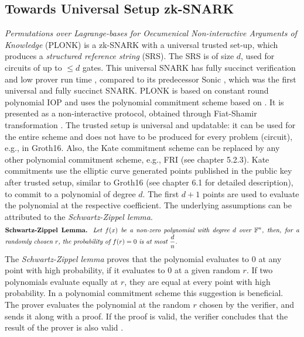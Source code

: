 \subsection{Towards Universal Setup zk-SNARK}
\textit{Permutations over Lagrange-bases for Oecumenical Non-interactive Arguments of Knowledge} (PLONK) is a zk-SNARK with a universal trusted set-up, which produces a \textit{structured reference string} (SRS). The SRS is of size \(d\), used for circuits of up to \(\leq d\) gates. This universal SNARK has fully succinct verification and low prover run time \citep{PLONKcryptoeprint:2019/953}, compared to its predecessor Sonic \citep{SONIC10.1145/3319535.3339817}, which was the first universal and fully succinct SNARK. PLONK is based on constant round polynomial IOP and uses the polynomial commitment scheme based on \citet{Kate2010ConstantSizeCT}. It is presented as a non-interactive protocol, obtained through Fiat-Shamir transformation \citep{PLONKcryptoeprint:2019/953}. The trusted setup is universal and updatable: it can be used for the entire scheme and does not have to be produced for every problem (circuit), e.g., in Groth16. Also, the Kate commitment scheme can be replaced by any other polynomial commitment scheme, e.g., FRI (see chapter 5.2.3). 
Kate commitments use the elliptic curve generated points published in the public key after trusted setup, similar to Groth16 (see chapter 6.1 for detailed description), to commit to a polynomial of degree \(d\). The first \(d+1\) points are used to evaluate the polynomial at the respective coefficient. The underlying assumptions can be attributed to the \textit{Schwartz-Zippel lemma}.
\begin{align*}
    \text{\parbox{450pt}{\textbf{Schwartz-Zippel Lemma.} \textit{Let \(f(x)\) be a non-zero polynomial with degree \(d\) over \begin{math}\mathbb{F}^n\end{math}, then, for a randomly chosen \(r\), the probability of \(f(r) = 0\) is at most \(\frac{d}{n}\).}}}
\end{align*}
The \textit{Schwartz-Zippel lemma} proves that the polynomial evaluates to 0 at any point with high probability, if it evaluates to 0 at a given random \(r\). If two polynomials evaluate equally at \(r\), they are equal at every point with high probability. In a polynomial commitment scheme this suggestion is beneficial. The prover evaluates the polynomial at the random \(r\) chosen by the verifier, and sends it along with a proof. If the proof is valid, the verifier concludes that the result of the prover is also valid \citep{Kate2010ConstantSizeCT}.

